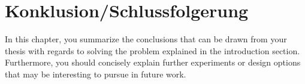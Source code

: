 \chapter{Konklusion/Schlussfolgerung}%
\label{cha:conclusion}

In this chapter, you summarize the conclusions that can be drawn from your thesis with regards to solving the problem explained in the introduction section.
Furthermore, you should concisely explain further experiments or design options that may be interesting to pursue in future work.
